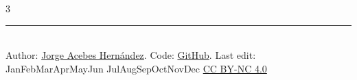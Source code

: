 \documentclass[8pt,a4paper,landscape,fleqn]{extarticle}
\makeatletter
\renewcommand{\today}{%
  \number\day\,%
  \@shortmonth{\month} %
  \number\year
}
\newcommand{\@shortmonth}[1]{%
  \ifcase#1\or Jan\or Feb\or Mar\or Apr\or May\or Jun%
  \or Jul\or Aug\or Sep\or Oct\or Nov\or Dec\fi
}
\makeatother
\begin{document}
\begin{multicols*}{3}
\hfill

\hrule
~\\
Author: \href{https://www.linkedin.com/in/jorge-acebes-hern%C3%A1ndez/}{Jorge Acebes Hernández}. Code: \href{https://github.com/JorgeAcebes/physics-cheat-sheets/tree/main/Inteligencia%20Artificial%20en%20Física}{GitHub}. Last edit: \today  \hfill \href{https://creativecommons.org/licenses/by-nc/4.0/}{CC BY-NC 4.0}
\end{multicols*}
\end{document}
